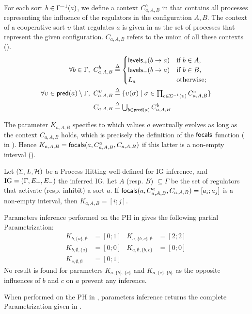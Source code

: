 For each sort $b \in \Gamma^{-1}(a)$, we define a context $C^b_{a,A,B}$ in  that contains all processes representing the influence of the regulators in the configuration $A,B$.
The context of a cooperative sort $\upsilon$ that regulates $a$ is given in  as the set of processes that represent the given configuration.
$C_{a,A,B}$ refers to the union of all these contexts ().
\begin{align}
\label{eq:param_context}
\forall b\in\Gamma,~
C_{a,A,B}^b & \stackrel{\Delta}= \begin{cases}
\mathsf{levels}_+(b\rightarrow a) & \text{if $b \in A$,}\\
\mathsf{levels}_-(b\rightarrow a) & \text{if $b \in B$,}\\
L_a		& \text{otherwise;}\\
\end{cases}
\\
\label{eq:param_context_coop}
\forall \upsilon \in \mathsf{pred}(a)\setminus\Gamma,~
C_{a,A,B}^\upsilon & \stackrel{\Delta}= \{
\upsilon(\sigma) \mid \sigma \in \textstyle\prod_{c\in\Sigma^{-1}(\upsilon)}C_{a,A,B}^c \}
\\
C_{a,A,B} & \stackrel{\Delta}= \textstyle\bigcup_{b\in\mathsf{pred}(a)} C^b_{a,A,B}
\label{eq:K-ctx}
\end{align}

The parameter $K_{a,A,B}$ specifies to which values $a$ eventually evolves as long as the context
$C_{a,A,B}$ holds, which is precisely the definition of the $\mathsf{focals}$ function
( in ).
Hence $K_{a,A,B} = \mathsf{focals}(a,C^a_{a,A,B},C_{a,A,B})$ if this latter is a non-empty interval
().

\begin{proposition}
\label{pps:param_K}
Let $(\Sigma, L, \mathcal{H})$ be a Process Hitting well-defined for IG inference, and $\mathrm{IG} = (\Gamma,
E_+, E_-)$ the inferred IG.
Let $A$ (resp. $B$) $\subseteq \Gamma$ be the set of regulators that activate (resp. inhibit) a sort
$a$.
If $\mathsf{focals}(a,C^a_{a,A,B},C_{a,A,B})=[a_i;a_j]$ is a non-empty interval, 
	then $K_{a,A,B} = [i;j]$.
\end{proposition}

\begin{example*}
Parameters inference performed on the PH in  gives the following partial Parametrization:
\begin{align*}
K_{b,\{a\},\emptyset} &= [0 ; 1] & K_{a,\{b,c\},\emptyset} &= [2 ; 2] \\
K_{b,\emptyset,\{a\}} &= [0 ; 0] & K_{a,\emptyset,\{b,c\}} &= [0 ; 0] \\
K_{c,\emptyset,\emptyset} &= [0 ; 1]
\end{align*}
No result is found for parameters $K_{a,\{b\},\{c\}}$ and $K_{a,\{c\},\{b\}}$ as the opposite influences of $b$ and $c$ on $a$ prevent any inference.

When performed on the PH in , parameters inference returns the complete Parametrization given in .
\end{example*}

